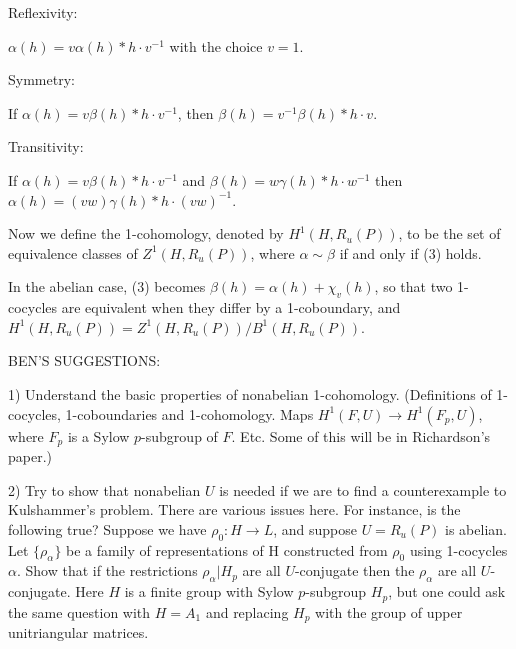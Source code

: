 Reflexivity:

$\alpha(h) = v\alpha(h)*h\cdot v^{-1}$ with the choice $v=1$.

Symmetry:

If $\alpha(h) = v\beta(h)*h\cdot v^{-1}$, then $\beta(h) = v^{-1}\beta(h)*h\cdot v$.

Transitivity:

If $\alpha(h) = v\beta(h)*h\cdot v^{-1}$ and $\beta(h) = w\gamma(h)*h\cdot w^{-1}$ then $\alpha(h) = (vw)\gamma(h)*h\cdot (vw)^{-1}$.

Now we define the 1-cohomology, denoted by $H^1(H,R_u(P))$, to be the set of equivalence classes of $Z^1(H,R_u(P))$, where $\alpha \sim \beta$ if and only if (3) holds.

In the abelian case, (3) becomes $\beta(h) = \alpha(h)+\chi_v(h)$, so that two 1-cocycles are equivalent when they differ by a 1-coboundary, and $H^1(H,R_u(P))=Z^1(H,R_u(P))/B^1(H,R_u(P))$.

BEN'S SUGGESTIONS:

1) Understand the basic properties of nonabelian 1-cohomology.  (Definitions of 1-cocycles, 1-coboundaries and 1-cohomology.  Maps $H^1(F,U)\rightarrow H^1(F_p,U)$, where $F_p$ is a Sylow $p$-subgroup of $F$.  Etc.  Some of this will be in Richardson's paper.)

2) Try to show that nonabelian $U$ is needed if we are to find a counterexample to Kulshammer's problem.  There are various issues here.  For instance, is the following true?  Suppose we have $\rho_0:H\rightarrow L$, and suppose $U=R_u(P)$ is abelian.  Let $\{\rho_\alpha\}$ be a family of representations of H constructed from $\rho_0$ using 1-cocycles $\alpha$.  Show that if the restrictions $\rho_\alpha|H_p$ are all $U$-conjugate then the $\rho_\alpha$ are all $U$-conjugate.  Here $H$ is a finite group with Sylow $p$-subgroup $H_p$, but one could ask the same question with $H=A_1$ and replacing $H_p$ with the group of upper unitriangular matrices.
